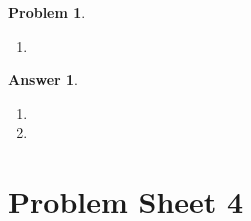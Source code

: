 \documentclass[a4paper]{article}
\newtheorem{ans}{Answer}[subsection]
\theoremstyle{new}
\newtheorem{qns}{Problem}[section]
\begin{document}
\newpage
\begin{qns}\leavevmode
\begin{enumerate}[label=(\alph*)]
\item 

\end{enumerate}
\end{qns}
\begin{ans}\leavevmode
\begin{enumerate}[label=(\alph*)]
\item

\item 
\end{enumerate}
\end{ans}
\newpage
\section{Problem Sheet 4}
\end{document}
